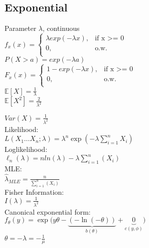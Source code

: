 \subsection*{Exponential}
Parameter $\lambda$, continuous\\
$ f_x(x)=
	\begin{cases}
		 \lambda exp(-\lambda x),&\text{if x >= 0}\\
		0,&\text{o.w.}\\
	\end{cases}
$\\

$P(X>a)= exp(-\lambda a)$\\

$ F_x(x)=
	\begin{cases}
		 1-exp(-\lambda x),&\text{if x >= 0}\\
		0,&\text{o.w.}\\
	\end{cases}
$\\

$\mathbb{E}[X]=\frac{1}{\lambda}$\\

$\mathbb{E}[X^2]=\frac{2}{\lambda^2}$

$Var(X)=\frac{1}{\lambda^2}$\\

Likelihood:\\
$L(X_1\dots X_n;\lambda)=\lambda^n\exp\left(-\lambda\sum_{i=1}^n X_i\right)$\\

Loglikelihood:\\

$\ell_n (\lambda)= n ln(\lambda) - \lambda \sum_{i=1}^n (X_i)$\\

MLE:\\

$\hat{\lambda}_{MLE}= \frac{n}{\sum^{n}_{i=1}(X_i)}$\\

Fisher Information:\\

$I(\lambda)= \frac{1}{\lambda^2}$\\

Canonical exponential form:\\

$f_{\theta}(y) = \exp\big(y\theta - \underbrace{(-\ln(-\theta))}_{b(\theta)} + \underbrace{0}_{c(y, \phi)}\big)$\\

$\theta = -\lambda = -\frac1{\mu}$\\

